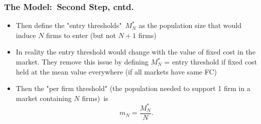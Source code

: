 \begin{frame}%

\frametitle{The Model:\ Second Step, cntd.}

\begin{itemize}
\item Then define the "entry thresholds"\ $M_{N}^{\ast }$ as the population
size that would induce $N$ firms to enter (but not $N+1$ firms)

\item In reality the entry threshold would change with the value of fixed
cost in the market. They remove this issue by defining $M_{N}^{\ast }$ =
entry threshold if fixed cost held at the mean value everywhere (if all
markets have same FC)

\item Then the "per firm threshold" (the population needed to support 1 firm
in a market containing $N$ firms)\ is%
\begin{equation*}
m_{N}=\frac{M_{N}^{\ast }}{N}.
\end{equation*}
\end{itemize}

\end{frame}%

